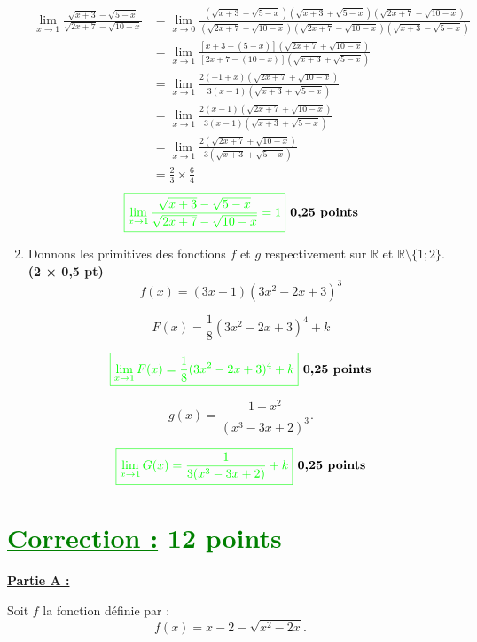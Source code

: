 \documentclass[12pt,a4paper]{article}
\begin{document}
\begin{enumerate}
    \begin{align*}
    \lim_{x \to 1} \frac{\sqrt{x + 3} - \sqrt{5 - x}}{\sqrt{2x + 7} - \sqrt{10 - x}}&=\lim_{x \to 0}\frac{\left( \sqrt{x + 3} - \sqrt{5 - x}\right)\left( \sqrt{x + 3} + \sqrt{5 - x}\right)\left( \sqrt{2x + 7} - \sqrt{10 - x}\right) }{\left( \sqrt{2x + 7} - \sqrt{10 - x}\right) \left( \sqrt{2x + 7} - \sqrt{10 - x}\right) \left( \sqrt{x + 3} - \sqrt{5 - x}\right)}\\
    &=\lim_{x \to 1} \frac{\left[ x + 3 - (5 - x)\right]\left( \sqrt{2x + 7} + \sqrt{10 - x}\right) }{ \left[  2x + 7 - (10 - x) \right]  \left( \sqrt{x + 3} + \sqrt{5 - x}\right)}\\
    &=\lim_{x \to 1} \frac{2(-1+x)\left( \sqrt{2x + 7} + \sqrt{10 - x}\right) }{ 3( x - 1 )  \left( \sqrt{x + 3} + \sqrt{5 - x}\right)}\\
    &=\lim_{x \to 1} \frac{2(x-1)\left( \sqrt{2x + 7} + \sqrt{10 - x}\right) }{ 3( x - 1 )  \left( \sqrt{x + 3} + \sqrt{5 - x}\right)}\\
    &=\lim_{x \to 1} \frac{2\left( \sqrt{2x + 7} + \sqrt{10 - x}\right) }{ 3\left( \sqrt{x + 3} + \sqrt{5 - x}\right)}\\
    &=\frac{2}{3} \times \frac{6}{4}
    \end{align*}
\[
\textcolor{green}{\boxed{ \lim_{x \to 1} \frac{\sqrt{x + 3} - \sqrt{5 - x}}{\sqrt{2x + 7} - \sqrt{10 - x}}=1 }} \textbf{ 0,25 points}
\]
    \item Donnons les primitives des fonctions \(f\) et \(g\) respectivement sur \(\mathbb{R}\) et \(\mathbb{R} \setminus \{1; 2\}\). \textbf{(2 × 0,5 pt)}
    \[
    f(x) = (3x-1)(3x^2-2x+3)^3 
    \]

		\[
    F(x) =\frac{1}{8}(3x^2-2x+3)^4+k
    \] 
       
    \[
     \textcolor{green}{\boxed{ \lim_{x \to 1} F(x) =\frac{1}{8}(3x^2-2x+3)^4 + k }} \textbf{ 0,25 points}
    \]
    
    \[
    g(x) = \frac{1-x^2}{(x^3-3x+2)^3}.
    \]
    
    \[
     \textcolor{green}{\boxed{ \lim_{x \to 1} G(x) = \frac{1}{3(x^3-3x+2)} + k }} \textbf{ 0,25 points}
    \]
\end{enumerate}
\section*{\textcolor{green}{\underline{Correction :} 12 points}}
\underline{\textbf{Partie A :}}

Soit \( f \) la fonction définie par :
\[
f(x) = x - 2 - \sqrt{x^2 - 2x}.
\]
\end{document}
